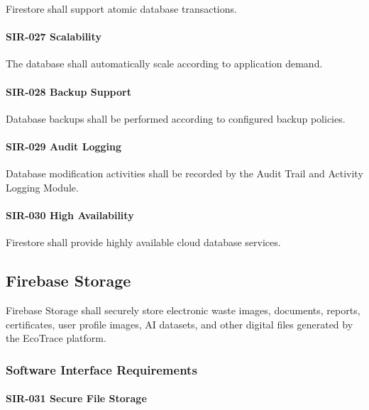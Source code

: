 Firestore shall support atomic database transactions.

\paragraph{SIR-027 Scalability}

The database shall automatically scale according to application demand.

\paragraph{SIR-028 Backup Support}

Database backups shall be performed according to configured backup
policies.

\paragraph{SIR-029 Audit Logging}

Database modification activities shall be recorded by the Audit Trail
and Activity Logging Module.

\paragraph{SIR-030 High Availability}

Firestore shall provide highly available cloud database services.


\subsection{Firebase Storage}

Firebase Storage shall securely store electronic waste images,
documents, reports, certificates, user profile images, AI datasets, and
other digital files generated by the EcoTrace platform.


\subsubsection*{Software Interface Requirements}

\paragraph{SIR-031 Secure File Storage}

